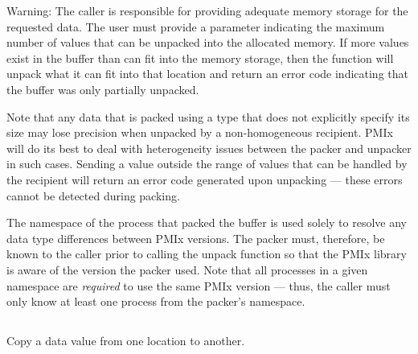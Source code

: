 Warning: The caller is responsible for providing adequate memory storage for the requested data. The user must provide a parameter indicating the maximum number of values that can be unpacked into the allocated memory. If more values exist in the buffer than can fit into the memory storage, then the function will unpack what it can fit into that location and return an error code indicating that the buffer was only partially unpacked.

Note that any data that is packed using a type that does not explicitly specify its size may lose precision when unpacked by a non-homogeneous recipient. \ac{PMIx} will do its best to deal with heterogeneity issues between the packer and unpacker in such cases. Sending a value outside the range of values that can be handled by the recipient will return an error code generated upon unpacking --- these errors cannot be detected during packing.

The namespace of the process that packed the buffer is used solely to resolve any data type
differences between \ac{PMIx} versions. The packer must, therefore, be
known to the caller prior to calling the unpack function so that the
\ac{PMIx} library is aware of the version the packer used. Note that
all processes in a given namespace are \textit{required} to use the same \ac{PMIx}
version --- thus, the caller must only know at least one process from the
packer's namespace.


\subsection{}

\summary

Copy a data value from one location to another.

\format


\begin{arglist}
\end{arglist}

